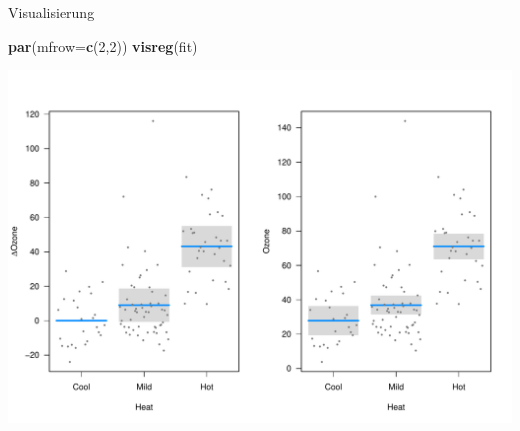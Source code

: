 \documentclass[ignorenonframetext,]{beamer}
\newenvironment{Shaded}{}{}
\newcommand{\KeywordTok}[1]{\textcolor[rgb]{0.00,0.44,0.13}{\textbf{{#1}}}}
\newcommand{\DataTypeTok}[1]{\textcolor[rgb]{0.56,0.13,0.00}{{#1}}}
\newcommand{\DecValTok}[1]{\textcolor[rgb]{0.25,0.63,0.44}{{#1}}}
\newcommand{\NormalTok}[1]{{#1}}
\begin{document}
\begin{frame}[fragile]{Visualisierung}

\begin{Shaded}
\begin{Highlighting}[]
\KeywordTok{par}\NormalTok{(}\DataTypeTok{mfrow=}\KeywordTok{c}\NormalTok{(}\DecValTok{2}\NormalTok{,}\DecValTok{2}\NormalTok{))}
\KeywordTok{visreg}\NormalTok{(fit)}
\end{Highlighting}
\end{Shaded}

\includegraphics{R_intern_files/figure-beamer/unnamed-chunk-309-1.pdf}

\end{frame}
\end{document}
